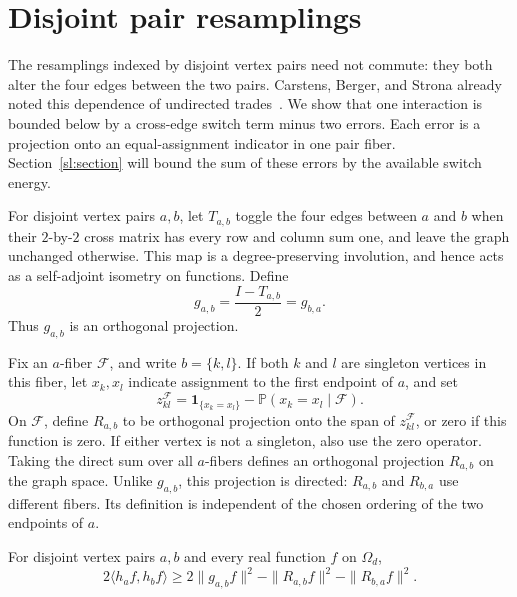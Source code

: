 \section{Disjoint pair resamplings}
\label{dis:section}

The resamplings indexed by disjoint vertex pairs need not commute:
they both alter the four edges between the two pairs. Carstens, Berger,
and Strona already noted this dependence of undirected
trades~\cite[Section~2.3 of the arXiv version]{CBS18}. We show that
one interaction is bounded below by a cross-edge switch term minus two
errors. Each error is a projection onto an equal-assignment indicator
in one pair fiber. Section~\ref{sl:section} will bound the sum of these
errors by the available switch energy.

For disjoint vertex pairs $a,b$, let $T_{a,b}$ toggle the four edges between
$a$ and $b$ when their $2$-by-$2$ cross matrix has every row and column sum
one, and leave the graph unchanged otherwise. This map is a degree-preserving
involution, and hence acts as a self-adjoint isometry on functions. Define
\begin{equation}
 g_{a,b}=\frac{I-T_{a,b}}2=g_{b,a}.
 \label{sl:def-cross}
\end{equation}
Thus $g_{a,b}$ is an orthogonal projection.

Fix an $a$-fiber $\mathcal F$, and write $b=\{k,l\}$. If both $k$ and $l$
are singleton vertices in this fiber, let $x_k,x_l$ indicate assignment to
the first endpoint of $a$, and set
\begin{equation}
 z_{kl}^{\mathcal F}
 =\mathbf 1_{\{x_k=x_l\}}
    -\mathbb P(x_k=x_l\mid\mathcal F).
 \label{sl:def-equality}
\end{equation}
On $\mathcal F$, define $R_{a,b}$ to be orthogonal projection onto the span
of $z_{kl}^{\mathcal F}$, or zero if this function is zero. If either vertex
is not a singleton, also use the zero operator. Taking the direct sum over
all $a$-fibers defines an orthogonal projection $R_{a,b}$ on the graph
space. Unlike $g_{a,b}$, this projection is directed: $R_{a,b}$ and
$R_{b,a}$ use different fibers. Its definition is independent of the chosen
ordering of the two endpoints of $a$.

\begin{proposition}\label{dis:interaction}
For disjoint vertex pairs $a,b$ and every real function $f$ on
$\Omega_d$,
\begin{equation}\label{dis:bound}
  2\langle h_a f,h_b f\rangle
  \ge 2\|g_{a,b}f\|^2
       -\|R_{a,b}f\|^2-\|R_{b,a}f\|^2.
\end{equation}
\end{proposition}

